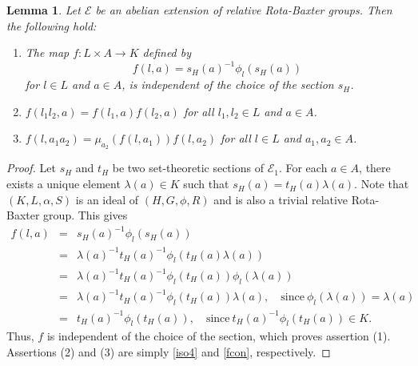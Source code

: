 \documentclass[11pt]{amsart}
\theoremstyle{thrm}
\theoremstyle{plain}
\newtheorem{lemma}[thm]{Lemma}
\theoremstyle{definition}
\numberwithin{equation}{section}
\begin{document}
\begin{lemma}\label{properties of f}
Let $\mathcal{E}$ be an abelian extension of relative Rota-Baxter groups. Then the following hold:
\begin{enumerate}
\item The map $f: L \times A \longrightarrow K$ defined by
$$ f(l,a)= s_H( a)^{-1} \phi_l(s_H(a))$$
for $l \in L$ and $a \in A$, is independent of the choice of the section $s_H$.
\item $f(l_1l_2,a) = f( l_1, a)f( l_2,a)$ for all $l_1, l_2 \in L$ and $a \in A$.
\item $f(l, a_1 a_2) = \mu_{ a_2}(f(l,a_1))f(l, a_2)$ for all $l \in L$ and $a_1, a_2 \in A$.
\end{enumerate}
\end{lemma}

\begin{proof}
Let $s_{H}$ and $t_H$ be two set-theoretic sections of $\mathcal{E}_1$. For each $a \in A$, there exists a unique element $\lambda(a) \in K$ such that $s_{H}(a)= t_H(a) \lambda(a)$. Note that $(K, L , \alpha, S)$ is an ideal of $(H, G , \phi, R)$ and is also a trivial relative Rota-Baxter group. This gives
\begin{eqnarray*}
f(l,a) &=& s_H( a)^{-1} \phi_l(s_H(a))\\
 &=&  \lambda(a)^{-1} t_H(a)^{-1} \phi_l(t_H(a)\lambda(a))\\
  &=&  \lambda(a)^{-1} t_H(a)^{-1} \phi_l(t_H(a)) \phi_l(\lambda(a))\\
  &=&  \lambda(a)^{-1} t_H(a)^{-1} \phi_l(t_H(a)) \lambda(a), \quad \textrm{since}~ \phi_l(\lambda(a))=\lambda(a)\\
  &=&   t_H(a)^{-1} \phi_l(t_H(a)), \quad \textrm{since}~ t_H(a)^{-1} \phi_l(t_H(a)) \in K.
\end{eqnarray*}
Thus, $f$ is independent of the choice of the section, which proves assertion (1). Assertions (2) and (3) are simply \eqref{iso4} and \eqref{fcon}, respectively.
\end{proof}
\end{document}
